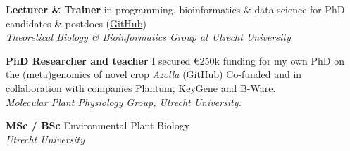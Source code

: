 \documentclass[a4paper,10pt]{article}
\begin{document}
{\begin{adjustbox}{valign=t}
\begin{minipage}[t]{0.6\textwidth}
\begin{description}
\raggedright
  \item[\normalfont \textcolor{ForestGreen}{\textbf{2022 -- now.}}] \textbf{Lecturer \&  Trainer} 
    in programming, bioinformatics \& data science for PhD candidates \& postdocs 
    (\href{https://github.com/lauralwd/professional_education}{GitHub})\\
    \textit{Theoretical Biology \& Bioinformatics Group at Utrecht University}
  \item[\normalfont \textcolor{ForestGreen}{\textbf{2017 -- 2022.}}] \textbf{PhD Researcher and teacher} 
    I secured €250k funding for my own PhD on the (meta)genomics of novel crop \textit{Azolla} 
    (\href{https://github.com/lauralwd/azolla_phd_thesis}{GitHub}) 
    Co-funded and in collaboration with companies Plantum, KeyGene and B-Ware.\\ 
    \textit{Molecular Plant Physiology Group, Utrecht University.}
  \item[\normalfont \textcolor{ForestGreen}{\textbf{2010 -- 2017.}}] \textbf{MSc / BSc} Environmental Plant Biology \\
    \textit{Utrecht University}
\end{description}



\end{minipage}
\end{adjustbox}}
\end{document}

